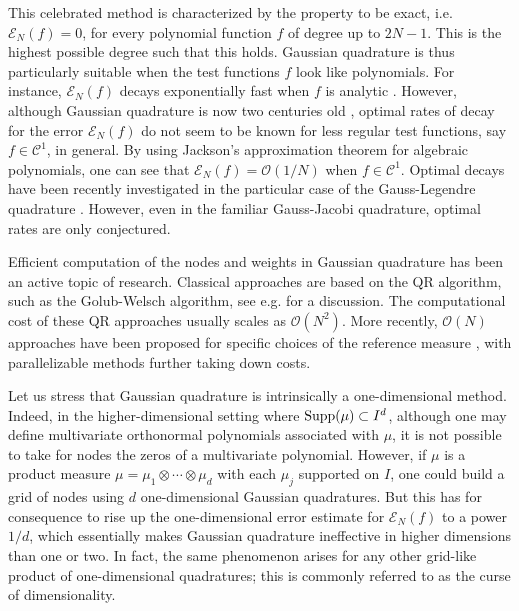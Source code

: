 \documentclass[a4paper,11pt]{article}
\numberwithin{equation}{section}
\theoremstyle{definition}
\newcommand{\cO}{\mathcal{O}}
\newcommand{\Supp}{{\rm Supp}}
\def\cE{\mathscr{E}}
\begin{document}
This celebrated method is characterized by the property to be exact, i.e.
$\mathscr E_N(f)=0$, for every polynomial function $f$ of degree up to $2N-1$.
This is the highest possible degree such that this holds. Gaussian quadrature is
thus particularly suitable when the test functions $f$ look like polynomials.
For instance, $\mathscr E_N(f)$ decays exponentially fast when $f$ is analytic
\citep{GaVa83}. However, although Gaussian quadrature is now two centuries old
\citep{Gau15}, optimal rates of decay for the error $\cE_N(f)$ do not seem to be
known for less regular test functions, say $f\in\mathscr C^1$, in general.  By
using Jackson's approximation theorem for algebraic polynomials, one can see
that $\mathscr E_N(f)=\cO(1/N)$ when $f\in\mathscr C^1$. Optimal decays have
been recently investigated in the particular case of the Gauss-Legendre
quadrature  \citep{XiBo12,Xia16}. However, even in the familiar Gauss-Jacobi
quadrature, optimal rates are only conjectured.

Efficient computation of the nodes and weights in Gaussian quadrature has been
an active topic of research. Classical approaches are
based on the QR algorithm, such as the Golub-Welsch algorithm, see
e.g. \citep[Section 3.5]{Gau04} for a discussion. The computational cost of
these QR approaches usually scales as $\cO(N^2)$. More recently, $\cO(N)$
approaches have been proposed for specific choices of the reference measure
\citep{GlLiRo07,HaTo13}, with parallelizable methods \citep{Bog14} further taking
down costs.

Let us stress that Gaussian quadrature is intrinsically a one-dimensional method.
Indeed, in the higher-dimensional setting where $\Supp(\mu)\subset I^d$,
although one may define multivariate orthonormal polynomials associated with
$\mu$, it is not possible to take for nodes the zeros of a multivariate
polynomial. However, if $\mu$ is a product measure
$\mu=\mu_1\otimes\cdots\otimes\mu_d$ with each $\mu_j$ supported on $I$, one
could build a grid of nodes using $d$ one-dimensional Gaussian quadratures. But
this has for consequence to rise up the one-dimensional error estimate for
$\mathcal E_N(f)$ to a power $1/d$, which essentially makes Gaussian quadrature
ineffective in higher dimensions than one or two. In fact, the same phenomenon
arises for any other grid-like product of one-dimensional quadratures; this is
commonly referred to as the curse of dimensionality.
\end{document}
